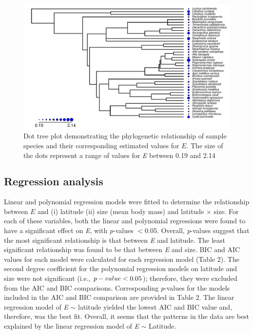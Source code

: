 \documentclass[11pt]{article}
\begin{document}
\begin{flushleft}
\begin{figure}[!htbp]
    \centering
    \includegraphics[width=6in]{dottree.pdf}
    \caption{\label{fig:4} Dot tree plot demonstrating the phylogenetic relationship of sample species and their corresponding estimated values for \emph{$E$}. The size of the dots represent a range of values for \emph{E} between 0.19 and 2.14}
\end{figure}

\subsection{Regression analysis}
Linear and polynomial regression models were fitted to determine the relationship between \emph{$E$} and (i) latitude (ii) size (mean body mass) and latitude $\times$ size. For each of these variables, both the linear and polynomial regressions were found to have a significant effect on \emph{E}, with \emph{p}-values $<$0.05. Overall, \emph{p}-values suggest that the most significant relationship is that between \emph{E} and latitude. The least significant relationship was found to be that between \emph{E} and size. BIC and AIC values for each model were calculated for each regression model (Table 2). The second degree coefficient for the polynomial regression models on latitude and size were not significant (i.e., $\emph{p}-value < 0.05$); therefore, they were excluded from the AIC and BIC comparisons. Corresponding \emph{p}-values for the models included in the AIC and BIC comparison are provided in Table 2. The linear regression model of \emph{E} $\sim$ latitude yielded the lowest AIC and BIC value and, therefore, was the best fit. Overall, it seems that the patterns in the data are best explained by the linear regression model of \emph{E} $\sim$ Latitude.
\newline


\end{flushleft}
\end{document}
